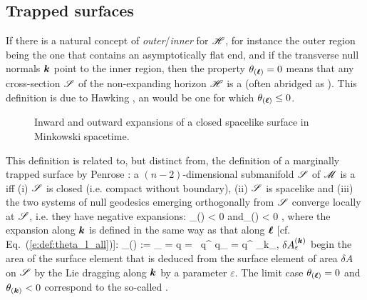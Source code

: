 {{\subsection{Trapped surfaces}

If there is a natural concept of \emph{outer}/\emph{inner} for $\mathscr{H}$, for
instance the outer region being the one that contains an asymptotically flat end,
and if the transverse null normals $\bm{k}$ point to the inner region, then
the property $\theta_{(\bm{\ell})}=0$ means that any cross-section $\mathscr{S}$ of the
non-expanding horizon $\mathscr{H}$ is a
(often abridged as ). This definition is due to
Hawking \cite{Hawki73}, an
would be one for which $\theta_{(\bm{\ell})}\leq 0$.

\begin{figure}
\vspace{5cm}
\caption[]{\label{f:def:expansions_flat} \footnotesize
Inward and outward expansions of a closed spacelike surface in Minkowski
spacetime.}
\end{figure}


This definition is related to, but distinct from, the definition of a
marginally trapped surface by Penrose \cite{Penro65}: a $(n-2)$-dimensional
submanifold $\mathscr{S}$ of $\mathscr{M}$ is a 
 iff (i) $\mathscr{S}$ is
closed (i.e. compact without boundary), (ii) $\mathscr{S}$ is spacelike and (iii)
the two systems of null geodesics emerging orthogonally from $\mathscr{S}$ converge
locally at $\mathscr{S}$, i.e. they have negative expansions:
\be
    \theta_{(\wl)} < 0 \quad\mbox{and}\quad \theta_{()} < 0 ,
\ee
where the expansion along $\bm{k}$ is defined in the same way as that along
$\bm{\ell}$ [cf. Eq.~(\ref{e:def:theta_l_all})]:
\be
    \theta_{()} := \lim_{\varepsilon{}} 
        =   \ln q
        =  \, q^{\mu\nu}  q_{\mu\nu}
        = q^{\mu\nu} \nabla_\mu k_\nu ,
\ee
$\delta A^{(\bm{k})}_\varepsilon$ begin the area of the surface element
that is deduced from the surface element of area $\delta A$ on $\mathscr{S}$ by the
Lie dragging along $\bm{k}$ by a parameter $\varepsilon$.
The limit case $\theta_{(\bm{\ell})} = 0$ and $\theta_{(\bm{k})}<0$ correspond
to the so-called .

}}
